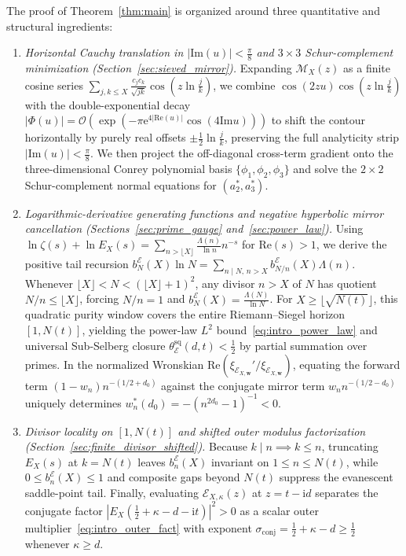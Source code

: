 \documentclass[11pt,reqno]{amsart}
\theoremstyle{definition}
\theoremstyle{remark}
\numberwithin{equation}{section}
\newcommand{\ee}{\mathrm{e}}
\newcommand{\ii}{\mathrm{i}}
\newcommand{\Rea}{\mathrm{Re}}
\newcommand{\Ima}{\mathrm{Im}}
\begin{document}
The proof of Theorem~\ref{thm:main} is organized around three quantitative and structural ingredients:
\begin{enumerate}[label=\textup{(\arabic*)},leftmargin=2.2em]
\item \textit{Horizontal Cauchy translation in $|\Ima(u)| < \frac{\pi}{8}$ and $3\times 3$ Schur-complement minimization (Section~\ref{sec:sieved_mirror}).} Expanding $\mathcal{M}_X(z)$ as a finite cosine series $\sum_{j,k\le X}\frac{c_j c_k}{\sqrt{jk}}\cos(z\ln\frac{j}{k})$, we combine $\cos(2zu)\cos(z\ln\frac{j}{k})$ with the double-exponential decay $|\Phi(u)| = \mathcal{O}(\exp(-\pi\ee^{4|\Rea(u)|}\cos(4\Ima u)))$ to shift the contour horizontally by purely real offsets $\pm\frac{1}{2}\ln\frac{j}{k}$, preserving the full analyticity strip $|\Ima(u)| < \frac{\pi}{8}$. We then project the off-diagonal cross-term gradient onto the three-dimensional Conrey polynomial basis $\{\phi_1, \phi_2, \phi_3\}$ and solve the $2 \times 2$ Schur-complement normal equations for $(a_2^*, a_3^*)$.
\item \textit{Logarithmic-derivative generating functions and negative hyperbolic mirror cancellation (Sections~\ref{sec:prime_gauge} and~\ref{sec:power_law}).} Using $\ln\zeta(s) + \ln E_X(s) = \sum_{n > \lfloor X\rfloor}\frac{\Lambda(n)}{\ln n}n^{-s}$ for $\Rea(s) > 1$, we derive the positive tail recursion $b_N^{\mathcal{E}}(X)\ln N = \sum_{n \mid N,\, n > X} b_{N/n}^{\mathcal{E}}(X)\Lambda(n)$. Whenever $\lfloor X\rfloor < N < (\lfloor X\rfloor + 1)^2$, any divisor $n > X$ of $N$ has quotient $N/n \le \lfloor X\rfloor$, forcing $N/n = 1$ and $b_N^{\mathcal{E}}(X) = \frac{\Lambda(N)}{\ln N}$. For $X \ge \lfloor\sqrt{N(t)}\rfloor$, this quadratic purity window covers the entire Riemann--Siegel horizon $[1, N(t)]$, yielding the power-law $L^2$ bound~\eqref{eq:intro_power_law} and universal Sub-Selberg closure $\theta_{\mathcal{E}}^{\mathrm{sq}}(d,t) < \frac{1}{2}$ by partial summation over primes. In the normalized Wronskian $\Rea(\xi_{\mathcal{E}_{X,\mathbf{w}}}'/\xi_{\mathcal{E}_{X,\mathbf{w}}})$, equating the forward term $(1-w_n)n^{-(1/2+d_0)}$ against the conjugate mirror term $w_n n^{-(1/2-d_0)}$ uniquely determines $w_n^*(d_0) = -(n^{2d_0}-1)^{-1} < 0$.
\item \textit{Divisor locality on $[1, N(t)]$ and shifted outer modulus factorization (Section~\ref{sec:finite_divisor_shifted}).} Because $k \mid n \implies k \le n$, truncating $E_X(s)$ at $k = N(t)$ leaves $b_n^{\mathcal{E}}(X)$ invariant on $1 \le n \le N(t)$, while $0 \le b_n^{\mathcal{E}}(X) \le 1$ and composite gaps beyond $N(t)$ suppress the evanescent saddle-point tail. Finally, evaluating $\mathcal{E}_{X,\kappa}(z)$ at $z = t - \ii d$ separates the conjugate factor $|E_X(\frac{1}{2}+\kappa-d-\ii t)|^2 > 0$ as a scalar outer multiplier~\eqref{eq:intro_outer_fact} with exponent $\sigma_{\mathrm{conj}} = \frac{1}{2} + \kappa - d \ge \frac{1}{2}$ whenever $\kappa \ge d$.
\end{enumerate}
\end{document}
